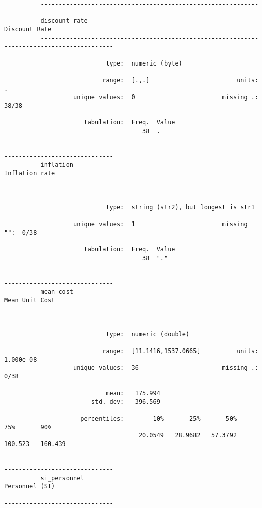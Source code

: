 \documentclass{article}
\begin{document}
\begin{verbatim}
          ------------------------------------------------------------------------------------------
          discount_rate                                                                Discount Rate
          ------------------------------------------------------------------------------------------
          
                            type:  numeric (byte)
          
                           range:  [.,.]                        units:  .
                   unique values:  0                        missing .:  38/38
          
                      tabulation:  Freq.  Value
                                      38  .
          
          ------------------------------------------------------------------------------------------
          inflation                                                                   Inflation rate
          ------------------------------------------------------------------------------------------
          
                            type:  string (str2), but longest is str1
          
                   unique values:  1                        missing "":  0/38
          
                      tabulation:  Freq.  Value
                                      38  "."
          
          ------------------------------------------------------------------------------------------
          mean_cost                                                                   Mean Unit Cost
          ------------------------------------------------------------------------------------------
          
                            type:  numeric (double)
          
                           range:  [11.1416,1537.0665]          units:  1.000e-08
                   unique values:  36                       missing .:  0/38
          
                            mean:   175.994
                        std. dev:   396.569
          
                     percentiles:        10%       25%       50%       75%       90%
                                     20.0549   28.9682   57.3792   100.523   160.439
          
          ------------------------------------------------------------------------------------------
          si_personnel                                                                Personnel (SI)
          ------------------------------------------------------------------------------------------
          

\end{verbatim}
\end{document}
